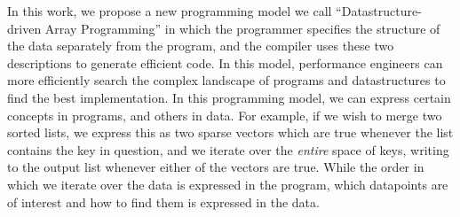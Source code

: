 
%
%


In this work, we propose a new programming model we call ``Datastructure-driven Array Programming'' in which the programmer specifies the structure of the data separately from the program, and the compiler uses these two descriptions to generate efficient code. In this model, performance engineers can more efficiently search the
complex landscape of programs and datastructures to find the best implementation. In this programming model, we can express certain concepts in programs, and others in data. For example, if we wish to merge two sorted lists, we express this as two sparse vectors which are true whenever the list contains the key in question, and we iterate over the \textit{entire} space of keys, writing to the output list whenever either of the vectors are true.
While the order in which we iterate over the data is expressed in the program, which datapoints are of interest and how to find them is expressed in the data.

